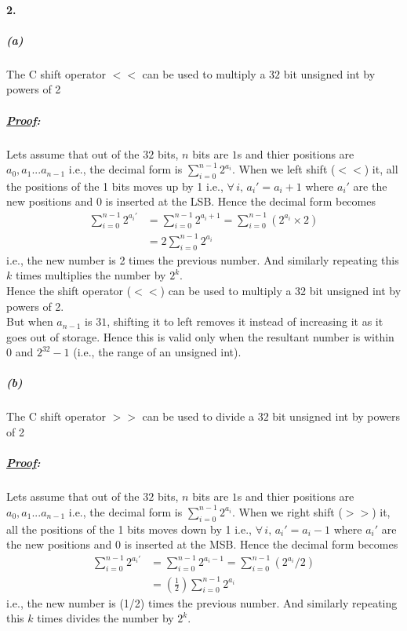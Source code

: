 \documentclass[12pt, letterpaper]{article}
\begin{document}
\paragraph{2.}
\subparagraph{(a)} The C shift operator $<<$ can be used to multiply a $32$ bit unsigned int by powers of 2
\subparagraph{\textit{\underline{Proof}:}}

Lets assume that out of the $32$ bits, $n$ bits are $1$s and thier positions are $a_0,a_1 ...a_{n-1}$ i.e.,
the decimal form is $\sum_{i=0}^{n-1}2^{a_i}$.
When we left shift ($<<$) it, all the positions of the 1 bits moves up by 1 i.e., $\forall\, i,\,a_i' = a_i + 1$  where $a_i'$ are the new positions and $0$ is inserted at the LSB.
Hence the decimal form becomes
\[\begin{split}
\sum_{i=0}^{n-1}2^{a_i'} &= \sum_{i=0}^{n-1}2^{a_i + 1}
= \sum_{i=0}^{n-1}(2^{a_i} \times 2)\\
&= \boxed{2\sum_{i=0}^{n-1}2^{a_i}}
\end{split}\]
i.e., the new number is 2 times the previous number.
And similarly repeating this $k$ times multiplies the number by $2^k$.\\

Hence the shift operator ($<<$) can be used to multiply a 32 bit unsigned int by powers of 2.\\

But when $a_{n-1}$ is $31$, shifting it to left removes it instead of increasing it as it goes out of storage.
Hence this is valid only when the resultant number is within $0$ and $2^{32} - 1$ (i.e., the range of an unsigned int).

\subparagraph{(b)} The C shift operator $>>$ can be used to divide a $32$ bit unsigned int by powers of 2
\subparagraph{\textit{\underline{Proof}:}}

Lets assume that out of the $32$ bits, $n$ bits are $1$s and thier positions are $a_0,a_1 ...a_{n-1}$ i.e.,
the decimal form is $\sum_{i=0}^{n-1}2^{a_i}$.
When we right shift ($>>$) it, all the positions of the 1 bits moves down by 1 i.e., $\forall\, i,\,a_i' = a_i - 1$  where $a_i'$ are the new positions and $0$ is inserted at the MSB.
Hence the decimal form becomes
\[\begin{split}
\sum_{i=0}^{n-1}2^{a_i'} &= \sum_{i=0}^{n-1}2^{a_i - 1}
= \sum_{i=0}^{n-1}(2^{a_i} /2)\\
&= \boxed{(\frac{1}{2})\sum_{i=0}^{n-1}2^{a_i}}
\end{split}\]
i.e., the new number is (1/2) times the previous number.
And similarly repeating this $k$ times divides the number by $2^k$.\\
\end{document}
